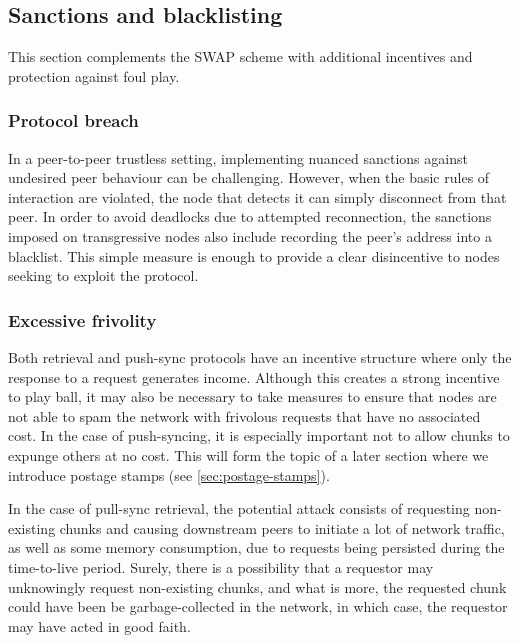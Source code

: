 


\subsection{Sanctions and blacklisting \statusgreen}\label{sec:sanctions}
\red{}

This section complements the SWAP scheme with additional incentives and protection against foul play. 

\subsubsection{Protocol breach}

In a peer-to-peer trustless setting, implementing nuanced sanctions against undesired peer behaviour can be challenging. However, when the basic rules of interaction are violated, the node that detects it can simply disconnect from that peer. In order to avoid deadlocks due to attempted reconnection, the sanctions imposed on transgressive nodes also include recording the peer's address into a blacklist. This simple measure is enough to provide a clear disincentive to nodes seeking to exploit the protocol. 

\subsubsection{Excessive frivolity}

Both retrieval and push-sync protocols have an incentive structure where only the response to a request generates income. Although this creates a strong incentive to play ball, it may also be necessary to take measures to ensure that nodes are not able to spam the network with frivolous requests that have no associated cost. In the case of push-syncing, it is especially important not to allow chunks to expunge others at no cost. This will form the topic of a later section where we introduce postage stamps (see \ref{sec:postage-stamps}).

In the case of pull-sync retrieval, the potential attack consists of requesting non-existing chunks and causing downstream peers to initiate a lot of network traffic, as well as some memory consumption, due to requests being persisted during the time-to-live period.
Surely, there is a possibility that a requestor may unknowingly request non-existing chunks, and what is more, the requested chunk could have been be garbage-collected in the network, in which case, the requestor may have acted in good faith. 

